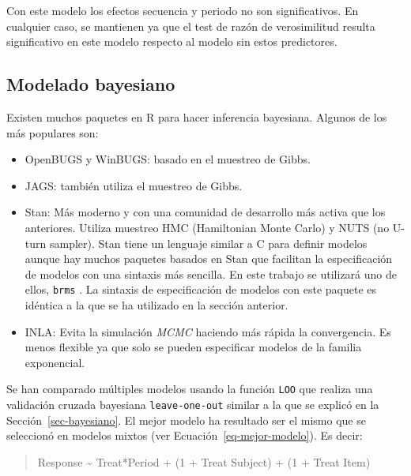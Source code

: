 \documentclass[
  12pt,
  a4paper,
  extrafontsizes,
  onecolumn,
  openright,
  table]{memoir}
\providecommand{\tightlist}{%
  \setlength{\itemsep}{0pt}\setlength{\parskip}{0pt}}\usepackage{longtable,booktabs,array}
\begin{document}
\normalsize

Con este modelo los efectos secuencia y periodo no son significativos.
En cualquier caso, se mantienen ya que el test de razón de verosimilitud
resulta significativo en este modelo respecto al modelo sin estos
predictores.

\hypertarget{sec-bayesiano-2}{%
\subsection{Modelado bayesiano}\label{sec-bayesiano-2}}

Existen muchos paquetes en R para hacer inferencia bayesiana. Algunos de
los más populares son:

\begin{itemize}
\tightlist
\item
  OpenBUGS y WinBUGS: basado en el muestreo de Gibbs.
\item
  JAGS: también utiliza el muestreo de Gibbs.
\item
  Stan: Más moderno y con una comunidad de desarrollo más activa que los
  anteriores. Utiliza muestreo HMC (Hamiltonian Monte Carlo) y NUTS (no
  U-turn sampler). Stan tiene un lenguaje similar a C para definir
  modelos aunque hay muchos paquetes basados en Stan que facilitan la
  especificación de modelos con una sintaxis más sencilla. En este
  trabajo se utilizará uno de ellos, \texttt{brms}
  \autocite[ver][]{brms} . La sintaxis de especificación de modelos con
  este paquete es idéntica a la que se ha utilizado en la sección
  anterior.
\item
  INLA: Evita la simulación \emph{\gls{MCMC}} haciendo más rápida la
  convergencia. Es menos flexible ya que solo se pueden especificar
  modelos de la familia exponencial.
\end{itemize}

Se han comparado múltiples modelos usando la función \texttt{LOO} que
realiza una validación cruzada bayesiana \texttt{leave-one-out} similar
a la que se explicó en la Sección~\ref{sec-bayesiano}. El mejor modelo
ha resultado ser el mismo que se seleccionó en modelos mixtos (ver
Ecuación~\ref{eq-mejor-modelo}). Es decir:

\small

\begin{quote}
Response \textasciitilde{} Treat*Period + (1 + Treat \textbar{} Subject)
+ (1 + Treat \textbar{} Item) \normalsize
\end{quote}

\scriptsize
\end{document}
